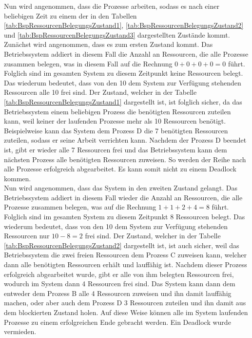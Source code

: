 \begin{description}
\begin{description}
								Nun wird angenommen, dass die Prozesse arbeiten, sodass es nach einer beliebigen Zeit zu einem der in den Tabellen \ref{tab:BspRessourcenBelegungsZustand1}, \ref{tab:BspRessourcenBelegungsZustand2} und \ref{tab:BspRessourcenBelegungsZustand3} dargestellten Zustände kommt.\\
								Zunächst wird angenommen, dass es zum ersten Zustand kommt. Das Betriebssystem addiert in diesem Fall die Anzahl an Ressourcen, die alle Prozesse zusammen belegen, was in diesem Fall auf die Rechnung $0 + 0 + 0 + 0 = 0$ führt. Folglich sind im gesamten System zu diesem Zeitpunkt keine Ressourcen belegt. Das wiederum bedeutet, dass von den 10 dem System zur Verfügung stehenden Ressourcen alle 10 frei sind. Der Zustand, welcher in der Tabelle \ref{tab:BspRessourcenBelegungsZustand1} dargestellt ist, ist folglich sicher, da das Betriebssystem einem beliebigen Prozess die benötigten Ressourcen zuteilen kann, weil keiner der laufenden Prozesse mehr als 10 Ressourcen benötigt. Beispielweise kann das System dem Prozess D die 7 benötigten Ressourcen zuteilen, sodass er seine Arbeit verrichten kann. Nachdem der Prozess D beendet ist, gibt er wieder alle 7 Ressourcen frei und das Betriebssystem kann dem nächsten Prozess alle benötigten Ressourcen zuweisen. So werden der Reihe nach alle Prozesse erfolgreich abgearbeitet. Es kann somit nicht zu einem Deadlock kommen.\\
								Nun wird angenommen, dass das System in den zweiten Zustand gelangt. Das Betriebssystem addiert in diesem Fall wieder die Anzahl an Ressourcen, die alle Prozesse zusammen belegen, was auf die Rechnung $1 + 1 + 2 + 4 = 8$ führt. Folglich sind im gesamten System zu diesem Zeitpunkt 8 Ressourcen belegt. Das wiederum bedeutet, dass von den 10 dem System zur Verfügung stehenden Ressourcen nur $10 - 8 = 2$ frei sind. Der Zustand, welcher in der Tabelle \ref{tab:BspRessourcenBelegungsZustand2} dargestellt ist, ist auch sicher, weil das Betriebssystem die zwei freien Ressourcen dem Prozess C zuweisen kann, welcher dann alle benötigten Ressourcen erhält und lauffähig ist. Nachdem dieser Prozess erfolgreich abgearbeitet wurde, gibt er alle von ihm belegten Ressourcen frei, wodurch im System dann 4 Ressourcen frei sind. Das System kann dann dem entweder dem Prozess B alle 4 Ressourcen zuweisen und ihn damit lauffähig machen, oder aber auch dem Prozess D 3 Ressourcen zuteilen und ihn damit aus dem blockierten Zustand holen. Auf diese Weise können alle im System laufenden Prozesse zu einem erfolgreichen Ende gebracht werden. Ein Deadlock wurde vermieden.\\

\end{description}
\end{description}
